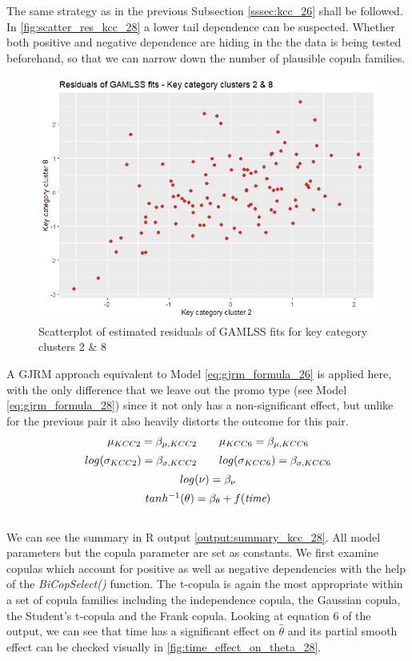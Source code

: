 
The same strategy as in the previous Subsection \ref{sssec:kcc_26} shall be followed. In \autoref{fig:scatter_res_kcc_28} a lower tail dependence can be suspected. Whether both positive and negative dependence are hiding in the the data is being tested beforehand, so that we can narrow down the number of plausible copula families.
\\

\begin{figure}[H]
\centering
  \includegraphics[width=0.45\linewidth]{figures/scatter_res_kcc_28.png}
  \caption{Scatterplot of estimated residuals of GAMLSS fits for key category clusters 2 \& 8}
  \label{fig:scatter_res_kcc_28}
\end{figure}


A \ac{GJRM} approach equivalent to Model \ref{eq:gjrm_formula_26} is applied here, with the only difference that we leave out the promo type (see Model \ref{eq:gjrm_formula_28}) since it not only has a non-significant effect, but unlike for the previous pair it also heavily distorts the outcome for this pair. \\
\begin{equation}
\begin{array}{c}
\mu_{KCC 2}=\beta_{\mu,KCC2} \qquad \mu_{KCC 6}=\beta_{\mu,KCC6}  \\  \noalign{\vskip5pt}

log(\sigma_{KCC 2})=\beta_{\sigma,KCC2} \qquad log(\sigma_{KCC 6})=\beta_{\sigma,KCC6} \\  \noalign{\vskip5pt}

log(\nu) = \beta_{\nu} \\  \noalign{\vskip5pt}

tanh^{-1}(\theta)=\beta_{\theta}  +f(\textit{time})
\end{array}
\label{eq:gjrm_formula_28}
\end{equation} \\
We can see the summary in R output \ref{output:summary_kcc_28}. All model parameters but the copula parameter are set as constants. We first examine copulas which account for positive as well as negative dependencies with the help of the \textit{BiCopSelect()} function. The t-copula is again the most appropriate within a set of copula families including the independence copula, the Gaussian copula, the Student's t-copula and the Frank copula. Looking at equation 6 of the output, we can see that time has a significant effect on $\hat{\theta}$ and its partial smooth effect can be checked visually in \autoref{fig:time_effect_on_theta_28}.
\\



